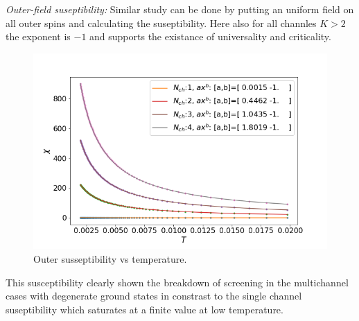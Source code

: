 \documentclass[reprint,prb,superscriptaddress]{revtex4-2}
\begin{document}
\textit{Outer-field suseptibility: } Similar study can be done by putting an uniform field on all outer spins and calculating the suseptibility. Here also for all channles $K>2$ the exponent is $-1$ and supports the existance of universality and criticality.
\begin{figure}[!htpb]
\centering
\includegraphics[scale=0.36]{plt/Outer_Field_Chi_Powerlaw_}
\caption{Outer susseptibility vs temperature.}
\label{fig:suseptibility_outer}
\end{figure}
This susceptibility clearly shown the breakdown of screening in the multichannel cases with degenerate ground states in constrast to the single channel suseptibility which saturates at a finite value at low temperature.
\end{document}
